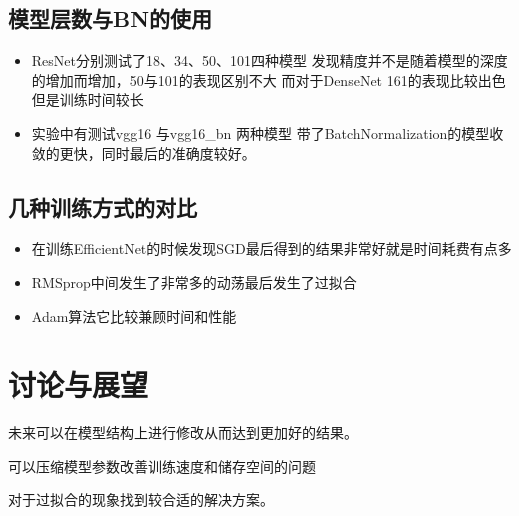 \documentclass[UTF8]{ctexart}
\begin{document}
\subsection{模型层数与BN的使用}
\begin{itemize}
\item ResNet分别测试了18、34、50、101四种模型 发现精度并不是随着模型的深度的增加而增加，50与101的表现区别不大
而对于DenseNet  161的表现比较出色但是训练时间较长
\item 实验中有测试vgg16 与vgg16\_bn 两种模型 带了BatchNormalization的模型收敛的更快，同时最后的准确度较好。
\end{itemize}
\subsection{几种训练方式的对比}
\begin{itemize}
\item 在训练EfficientNet的时候发现SGD最后得到的结果非常好就是时间耗费有点多
\item RMSprop中间发生了非常多的动荡最后发生了过拟合
\item Adam算法它比较兼顾时间和性能
\end{itemize}
\section{讨论与展望}
未来可以在模型结构上进行修改从而达到更加好的结果。

可以压缩模型参数改善训练速度和储存空间的问题

对于过拟合的现象找到较合适的解决方案。
\end{document}
